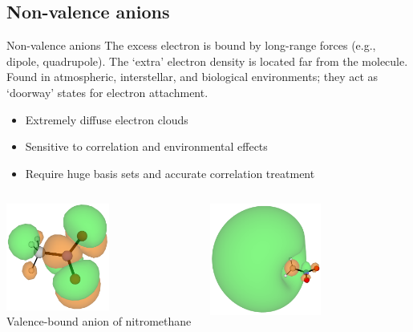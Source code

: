 \documentclass[9pt,t,xcolor=table]{beamer}
\begin{document}
\subsection{Non-valence anions}
\begin{frame}{\huge Non-valence anions}\large
    \vspace{5pt}
	\the\textheight
	The excess electron is bound by long-range forces (e.g., dipole, quadrupole). The `extra' electron density is located far from the molecule.\\
	Found in atmospheric, interstellar, and biological environments; they act as `doorway' states for electron attachment. 
    \begin{itemize} 

            \item Extremely diffuse electron clouds
            \item Sensitive to correlation and environmental effects
            \item Require huge basis sets and accurate correlation treatment
    \end{itemize}
    \vspace{5pt}
	\begin{columns}
		\begin{column}{0.27\textwidth}
			\centering
			\includegraphics[width=0.55\textwidth]{Figs/MeNO2_VBS.png}\\
			\vspace{3pt}
			\small Valence-bound anion of nitromethane
		\end{column}
		\begin{column}{0.3\textwidth}
			\centering
			\includegraphics[width=0.55\textwidth]{Figs/MeNO2_DBS.png}\\

\end{column}
\end{columns}
\end{frame}
\end{document}
